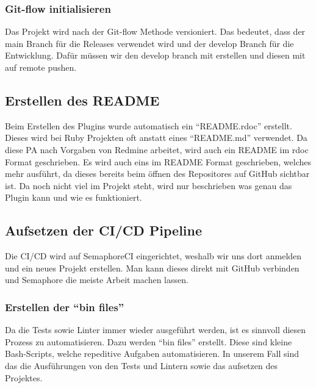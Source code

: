 \subsubsection{Git-flow initialisieren}
Das Projekt wird nach der Git-flow Methode versioniert. Das bedeutet, dass der main Branch für die Releases
verwendet wird und der develop Branch für die Entwicklung. \newline
Dafür müssen wir den develop branch mit  erstellen und diesen
mit  auf remote pushen. \newline

\subsection{Erstellen des README}
Beim Erstellen des Plugins wurde automatisch ein \enquote{README.rdoc} erstellt. Dieses wird bei Ruby Projekten
oft anstatt eines \enquote{README.md} verwendet. Da diese PA nach Vorgaben von Redmine arbeitet, wird auch ein
README im rdoc Format geschrieben. Es wird auch eins im README Format geschrieben, welches mehr ausführt, da dieses
bereits beim öffnen des Repositores auf GitHub sichtbar ist. \newline
Da noch nicht viel im Projekt steht, wird nur beschrieben was genau das Plugin kann und wie es funktioniert.

\subsection{Aufsetzen der CI/CD Pipeline}
Die CI/CD wird auf SemaphoreCI eingerichtet, weshalb wir uns dort anmelden und ein neues Projekt erstellen. Man kann dieses
direkt mit GitHub verbinden und Semaphore die meiste Arbeit machen lassen.

\subsubsection{Erstellen der \enquote{bin files}}
Da die Tests sowie Linter immer wieder ausgeführt werden, ist es sinnvoll diesen Prozess zu automatisieren. Dazu werden 
\enquote{bin files} erstellt. Diese sind kleine Bash-Scripts, welche repeditive Aufgaben automatisieren. In unserem Fall sind
das die Ausführungen von den Tests und Lintern sowie das aufsetzen des Projektes. \newline

